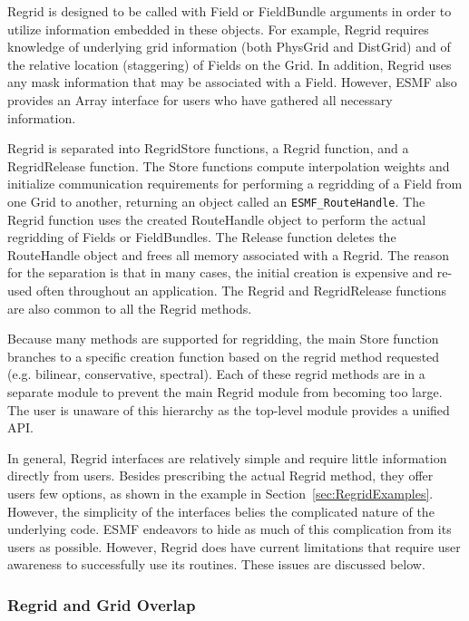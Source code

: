 

Regrid is designed to be called with Field or FieldBundle
arguments in order to utilize information embedded in
these objects.  For example, Regrid requires knowledge
of underlying grid information (both PhysGrid and DistGrid)
and of the relative location (staggering) of Fields on
the Grid.  In addition, Regrid uses any mask information
that may be associated with a Field.  However, ESMF also
provides an Array interface for users who have gathered all
necessary information.

Regrid is separated into RegridStore functions, a Regrid
function, and a RegridRelease function. The Store functions
compute interpolation weights and initialize communication
requirements for performing a regridding of a Field
from one Grid to another, returning an object called an
{\tt ESMF\_RouteHandle}.  The Regrid function uses
the created RouteHandle object to perform the actual regridding
of Fields or FieldBundles.  The Release function deletes the
RouteHandle object and frees all memory associated with a Regrid.
The reason for the separation is that in many cases, the
initial creation is expensive and re-used often throughout
an application.  The Regrid and RegridRelease functions are
also common to all the Regrid methods.

Because many methods are supported for regridding,
the main Store function branches to a specific
creation function based on the regrid method requested
(e.g. bilinear, conservative, spectral).  Each of
these regrid methods are in a separate module to
prevent the main Regrid module from becoming too
large.  The user is unaware of this hierarchy as the
top-level module provides a unified API.

In general, Regrid interfaces are relatively simple and require little
information directly from users.  Besides prescribing the actual Regrid method,
they offer users few options, as shown in the example in
Section~\ref{sec:RegridExamples}.  However, the simplicity of the interfaces
belies the complicated nature of the underlying code.  ESMF endeavors to hide as
much of this complication from its users as possible.  However, Regrid does have
current limitations that require user awareness to successfully use its
routines.  These issues are discussed below.

\subsubsection{Regrid and Grid Overlap}

